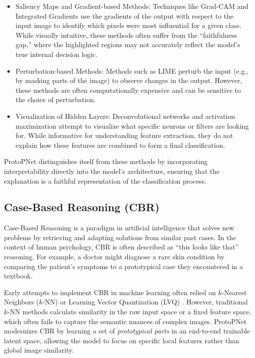 \documentclass[conference]{IEEEtran}
\begin{document}
\begin{itemize}
    \item Saliency Maps and Gradient-based Methods: Techniques like Grad-CAM \cite{b4} and Integrated Gradients \cite{b5} use the gradients of the output with respect to the input image to identify which pixels were most influential for a given class. While visually intuitive, these methods often suffer from the ``faithfulness gap,'' where the highlighted regions may not accurately reflect the model's true internal decision logic.
    \item Perturbation-based Methods: Methods such as LIME \cite{b6} perturb the input (e.g., by masking parts of the image) to observe changes in the output. However, these methods are often computationally expensive and can be sensitive to the choice of perturbation.
    \item Visualization of Hidden Layers: Deconvolutional networks \cite{zeiler2014visualizing} and activation maximization attempt to visualize what specific neurons or filters are looking for. While informative for understanding feature extraction, they do not explain how these features are combined to form a final classification.
\end{itemize}

ProtoPNet distinguishes itself from these methods by incorporating interpretability directly into the model's architecture, ensuring that the explanation is a faithful representation of the classification process.

\subsection{Case-Based Reasoning (CBR)}
Case-Based Reasoning is a paradigm in artificial intelligence that solves new problems by retrieving and adapting solutions from similar past cases. In the context of human psychology, CBR is often described as ``this looks like that'' reasoning. For example, a doctor might diagnose a rare skin condition by comparing the patient's symptoms to a prototypical case they encountered in a textbook. 

Early attempts to implement CBR in machine learning often relied on $k$-Nearest Neighbors ($k$-NN) or Learning Vector Quantization (LVQ) \cite{b7}. However, traditional $k$-NN methods calculate similarity in the raw input space or a fixed feature space, which often fails to capture the semantic nuances of complex images. ProtoPNet modernizes CBR by learning a set of \textit{prototypical parts} in an end-to-end trainable latent space, allowing the model to focus on specific local features rather than global image similarity.
\end{document}
